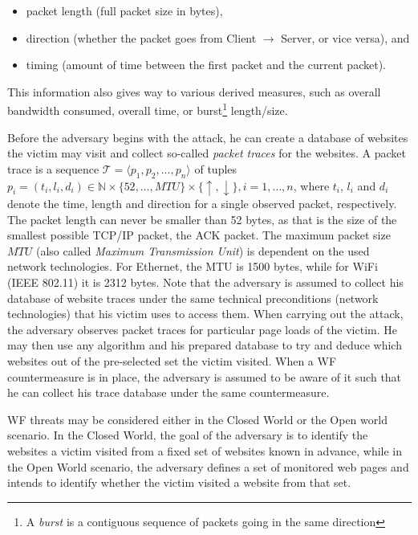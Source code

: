 \documentclass[
	ruledheaders=chapter,
	class=report,
	thesis={type=master, department=inf},
	accentcolor=1c,
	custommargins=true,
	marginpar=false,
	parskip=half-,
	fontsize=11pt,
]{tudapub}
\begin{document}
	\begin{itemize}
		\item packet length (full packet size in bytes),
		\item direction (whether the packet goes from Client $\to$ Server, or vice versa), and
		\item timing (amount of time between the first packet and the current packet).
	\end{itemize}

	This information also gives way to various derived measures, such as overall bandwidth consumed, overall time, or burst\footnote{A \textit{burst} is a contiguous sequence of packets going in the same direction} length/size.
	
	Before the adversary begins with the attack, he can create a database of websites the victim may visit and collect so-called \textit{packet traces} for the websites. A packet trace is a sequence $\mathcal{T} = \langle p_1,p_2,...,p_n\rangle$ of tuples $p_i = (t_i, l_i, d_i) \in \mathbb{N} \times \{52, \ldots, MTU\} \times \{\uparrow, \downarrow\}, i = 1,\ldots,n$, where $t_i$, $l_i$ and $d_i$ denote the time, length and direction for a single observed packet, respectively. The packet length can never be smaller than 52 bytes, as that is the size of the smallest possible TCP/IP packet, the ACK packet. The maximum packet size $MTU$ (also called \textit{Maximum Transmission Unit}) is dependent on the used network technologies. For Ethernet, the MTU is 1500 bytes, while for WiFi (IEEE 802.11) it is 2312 bytes. Note that the adversary is assumed to collect his database of website traces under the same technical preconditions (network technologies) that his victim uses to access them. When carrying out the attack, the adversary observes packet traces for particular page loads of the victim. He may then use any algorithm and his prepared database to try and deduce which websites out of the pre-selected set the victim visited. When a WF countermeasure is in place, the adversary is assumed to be aware of it such that he can collect his trace database under the same countermeasure.
	
	WF threats may be considered either in the Closed World or the Open world scenario. In the Closed World, the goal of the adversary is to identify the websites a victim visited from a fixed set of websites known in advance, while in the Open World scenario, the adversary defines a set of monitored web pages and intends to identify whether the victim visited a website from that set.
	
\end{document}
